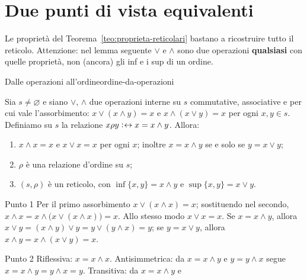 \newpage
\section{Due punti di vista equivalenti}\label{sec:equivalenza-reticoli}

Le proprietà del Teorema~\ref{teo:proprieta-reticolari} bastano a ricostruire tutto il reticolo. Attenzione: nel lemma seguente $\vee$ e $\wedge$
sono due operazioni \textbf{qualsiasi} con quelle proprietà, non (ancora) gli inf e i sup di un ordine.

\begin{concetto}
\begin{Lemma}{Dalle operazioni all'ordine}{ordine-da-operazioni}
    \begin{prerequisiti}
    \end{prerequisiti}
    Sia $s \neq \varnothing$ e siano $\vee$, $\wedge$ due operazioni interne su $s$ commutative, associative e per cui vale l'assorbimento:
    $x \vee (x \wedge y) = x$ e $x \wedge (x \vee y) = x$ per ogni $x, y \in s$. Definiamo su $s$ la relazione $x \rho y \mathrel{\vcentcolon\mkern1mu\leftrightarrow} x = x \wedge y$. Allora:
    \begin{enumerate}
        \item $x \wedge x = x$ e $x \vee x = x$ per ogni $x$; inoltre $x = x \wedge y$ se e solo se $y = x \vee y$;
        \item $\rho$ è una relazione d'ordine su $s$;
        \item $(s, \rho)$ è un reticolo, con $\inf\{x, y\} = x \wedge y$ e $\sup\{x, y\} = x \vee y$.
    \end{enumerate}
\end{Lemma}
\begin{dimostrazione}
    \begin{caso}{Punto 1}
        Per il primo assorbimento $x \vee (x \wedge x) = x$; sostituendo nel secondo, $x \wedge x = x \wedge \big(x \vee (x \wedge x)\big) = x$. Allo stesso modo $x \vee x = x$.
        Se $x = x \wedge y$, allora $x \vee y = (x \wedge y) \vee y = y \vee (y \wedge x) = y$; se $y = x \vee y$, allora $x \wedge y = x \wedge (x \vee y) = x$.
    \end{caso}
    \begin{caso}{Punto 2}
        Riflessiva: $x = x \wedge x$. Antisimmetrica: da $x = x \wedge y$ e $y = y \wedge x$ segue $x = x \wedge y = y \wedge x = y$. Transitiva: da $x = x \wedge y$ e

\end{caso}
\end{dimostrazione}
\end{concetto}
